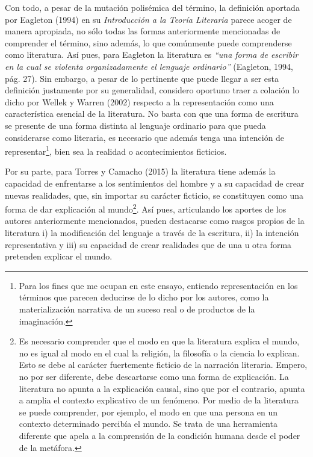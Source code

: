 \begin{refsection}
Con todo, a pesar de la mutación polisémica del término, la definición aportada por Eagleton (1994) en su \emph{Introducción a la Teoría Literaria} parece acoger de manera apropiada, no sólo todas las formas anteriormente mencionadas de comprender el término, sino además, lo que comúnmente puede comprenderse como literatura. Así pues, para Eagleton la literatura es \emph{``una forma de escribir en la cual se violenta organizadamente el lenguaje ordinario''} (Eagleton, 1994, pág. 27). Sin embargo, a pesar de lo pertinente que puede llegar a ser esta definición justamente por su generalidad, considero oportuno traer a colación lo dicho por Wellek y Warren (2002) respecto a la representación como una característica esencial de la literatura. No basta con que una forma de escritura se presente de una forma distinta al lenguaje ordinario para que pueda considerarse como literaria, es necesario que además tenga una intención de representar\footnote{Para los fines que me ocupan en este ensayo, entiendo representación en los términos que parecen deducirse de lo dicho por los autores, como la materialización narrativa de un suceso real o de productos de la imaginación.}, bien sea la realidad o acontecimientos ficticios.

Por su parte, para Torres y Camacho (2015) la literatura tiene además la capacidad de enfrentarse a los sentimientos del hombre y a su capacidad de crear nuevas realidades, que, sin importar su carácter ficticio, se constituyen como una forma de dar explicación al mundo\footnote{Es necesario comprender que el modo en que la literatura explica el mundo, no es igual al modo en el cual la religión, la filosofía o la ciencia lo explican. Esto se debe al carácter fuertemente ficticio de la narración literaria. Empero, no por ser diferente, debe descartarse como una forma de explicación. La literatura no apunta a la explicación causal, sino que por el contrario, apunta a amplia el contexto explicativo de un fenómeno. Por medio de la literatura se puede comprender, por ejemplo, el modo en que una persona en un contexto determinado percibía el mundo. Se trata de una herramienta diferente que apela a la comprensión de la condición humana desde el poder de la metáfora.}. Así pues, articulando los aportes de los autores anteriormente mencionados, pueden destacarse como rasgos propios de la literatura i) la modificación del lenguaje a través de la escritura, ii) la intención representativa y iii) su capacidad de crear realidades que de una u otra forma pretenden explicar el mundo.


\end{refsection}
